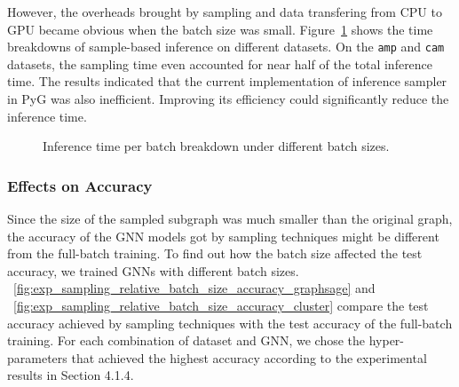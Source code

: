 However, the overheads brought by sampling and data transfering from CPU to GPU became obvious when the batch size was small.
%
Figure~\ref{fig:time_breakdown_of_inference_sampler} shows the time breakdowns of sample-based inference on different datasets.
%
On the \texttt{amp} and \texttt{cam} datasets, the sampling time even accounted for near half of the total inference time.
%
The results indicated that the current implementation of inference sampler in PyG was also inefficient.
%
Improving its efficiency could significantly reduce the inference time.


\begin{figure}[H]
   \centering
   \caption{Inference time per batch breakdown under different batch sizes.}
   \label{fig:time_breakdown_of_inference_sampler}
\end{figure}

\subsubsection{Effects on Accuracy}

Since the size of the sampled subgraph was much smaller than the original graph, the accuracy of the GNN models got by sampling techniques might be different from the full-batch training.
%
To find out how the batch size affected the test accuracy, we trained GNNs with different batch sizes.
%
\figurename~\ref{fig:exp_sampling_relative_batch_size_accuracy_graphsage} and \figurename~\ref{fig:exp_sampling_relative_batch_size_accuracy_cluster} compare the test accuracy achieved by sampling techniques with the test accuracy of the full-batch training.
%
For each combination of dataset and GNN, we chose the hyper-parameters that achieved the highest accuracy according to the experimental results in Section 4.1.4.

